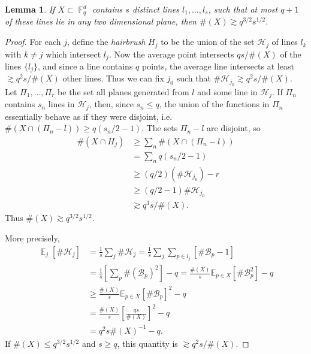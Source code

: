 \documentclass{article}
\DeclareMathOperator{\FF}{\mathbb{F}}
\DeclareMathOperator{\EE}{\mathbb{E}}
\theoremstyle{plain}
\newtheorem{lemma}[theorem]{Lemma}
\theoremstyle{definition}
\begin{document}
\begin{lemma}
    If $X \subset \FF_q^d$ contains $s$ distinct lines $l_1, \dots, l_s$, such that at most $q + 1$ of these lines lie in any two dimensional plane, then $\#(X) \gtrsim q^{3/2} s^{1/2}$.
\end{lemma}
\begin{proof}
    For each $j$, define the \emph{hairbrush} $H_j$ to be the union of the set $\mathcal{H}_j$ of lines $l_k$ with $k \neq j$ which intersect $l_j$. Now the average point intersects $qs / \#(X)$ of the lines $\{ l_j \}$, and since a line contains $q$ points, the average line intersects at least $\gtrsim q^2 s / \#(X)$ other lines. Thus we can fix $j_0$ such that $\# \mathcal{H}_{j_0} \gtrsim q^2 s / \#(X)$. Let $\Pi_1, \dots, \Pi_r$ be the set all planes generated from $l$ and some line in $\mathcal{H}_j$. If $\Pi_n$ contains $s_n$ lines in $\mathcal{H}_j$, then, since $s_n \leq q$, the union of the functions in $\Pi_n$ essentially behave as if they were disjoint, i.e. $\#(X \cap (\Pi_n - l)) \geq q (s_n / 2 - 1)$. The sets $\Pi_n - l$ are disjoint, so
    \begin{align*}
        \#(X \cap H_j) &\geq \sum_n \#(X \cap (\Pi_n - l))\\
        &= \sum_n q(s_n / 2 - 1)\\
        &\geq (q/2) (\# \mathcal{H}_{j_0}) - r\\
        &\geq (q/2 - 1) \# \mathcal{H}_{j_0}\\
        &\gtrsim q^3 s / \#(X).
    \end{align*}
    Thus $\#(X) \gtrsim q^{3/2} s^{1/2}$.



    More precisely,
    \begin{align*}
        \EE_j[ \# \mathcal{H}_j ] &= \frac{1}{s} \sum_j \# \mathcal{H}_j = \frac{1}{s} \sum_j \sum_{p \in l_j} \left[ \# \mathcal{B}_p - 1 \right]\\
        &= \frac{1}{s} \left[\sum_p \#( \mathcal{B}_p )^2 \right] - q = \frac{\#(X)}{s} \mathbb{E}_{p \in X} [ \# \mathcal{B}_p^2 ] - q\\
        &\geq \frac{\#(X)}{s} \mathbb{E}_{p \in X} [ \# \mathcal{B}_p ]^2 - q\\
        &= \frac{\#(X)}{s} \left[ \frac{qs}{\#(X)} \right]^2 - q\\
        &= q^2 s \#(X)^{-1} - q.
    \end{align*}
    If $\#(X) \leq q^{3/2} s^{1/2}$ and $s \geq q$, this quantity is $\gtrsim q^2 s / \#(X)$.
\end{proof}
\end{document}
